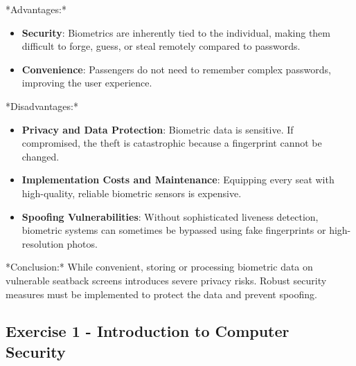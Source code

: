 \documentclass{article}
\begin{document}
*Advantages:*
\begin{itemize}
    \item \textbf{Security}: Biometrics are inherently tied to the individual, making them difficult to forge, guess, or steal remotely compared to passwords.
    \item \textbf{Convenience}: Passengers do not need to remember complex passwords, improving the user experience.

\end{itemize}
*Disadvantages:*
\begin{itemize}
    \item \textbf{Privacy and Data Protection}: Biometric data is sensitive. If compromised, the theft is catastrophic because a fingerprint cannot be changed.
    \item \textbf{Implementation Costs and Maintenance}: Equipping every seat with high-quality, reliable biometric sensors is expensive.
    \item \textbf{Spoofing Vulnerabilities}: Without sophisticated liveness detection, biometric systems can sometimes be bypassed using fake fingerprints or high-resolution photos.

\end{itemize}
*Conclusion:* While convenient, storing or processing biometric data on vulnerable seatback screens introduces severe privacy risks. Robust security measures must be implemented to protect the data and prevent spoofing.

\subsection{Exercise 1 - Introduction to Computer Security}
\end{document}
